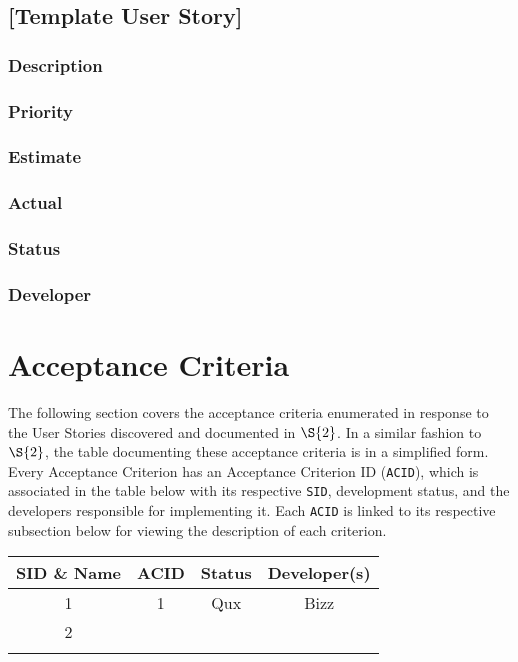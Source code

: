 \documentclass[11pt]{article}
\begin{document}
\subsection*{[Template User Story]}
\label{sec:org6d4fabe}
\subsubsection*{Description}
\label{sec:org4f36cb7}
\subsubsection*{Priority}
\label{sec:orgab3d1a1}
\subsubsection*{Estimate}
\label{sec:org71d6bdd}
\subsubsection*{Actual}
\label{sec:org20a3b1b}
\subsubsection*{Status}
\label{sec:org1bd0eeb}
\subsubsection*{Developer}
\label{sec:org796a0b8}
\section{Acceptance Criteria}
\label{sec:org76729d4}
The following section covers the acceptance criteria enumerated in response to the User Stories
discovered and documented in \hyperref[sec:org8cd8f44]{\(\S{2}\)}. In a similar fashion to \(\S{2}\), the table documenting these
acceptance criteria is in a simplified form. Every Acceptance Criterion has an Acceptance
Criterion ID (\texttt{ACID}), which is associated in the table below with its respective \texttt{SID}, development
status, and the developers responsible for implementing it. Each \texttt{ACID} is linked to its respective
subsection below for viewing the description of each criterion.

\begin{center}
\begin{tabular}{|c|c|c|c|}
SID \& Name & ACID & Status & Developer(s)\\
\hline
1 & 1 & Qux & Bizz\\
\hline
2 &  &  & \\
\hline
 &  &  & \\
\end{tabular}
\end{center}
\end{document}
